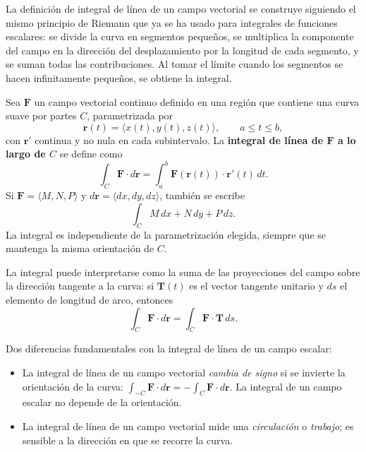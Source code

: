 La definición de integral de línea de un campo vectorial se construye
siguiendo el mismo principio de Riemann que ya se ha usado para
integrales de funciones escalares: se divide la curva en segmentos
pequeños, se multiplica la componente del campo en la dirección del
desplazamiento por la longitud de cada segmento, y se suman todas las
contribuciones. Al tomar el límite cuando los segmentos se hacen
infinitamente pequeños, se obtiene la integral.

\begin{definition}
Sea $\mathbf{F}$ un campo vectorial continuo definido en una región que
contiene una curva suave por partes $C$, parametrizada por
\[
\mathbf{r}(t) = \langle x(t), y(t), z(t) \rangle, \qquad a \le t \le b,
\]
con $\mathbf{r}'$ continua y no nula en cada subintervalo. La
\textbf{integral de línea de $\mathbf{F}$ a lo largo de $C$} se define
como
\[
\int_C \mathbf{F} \cdot d\mathbf{r}
= \int_a^b \mathbf{F}(\mathbf{r}(t)) \cdot \mathbf{r}'(t) \, dt.
\]
Si $\mathbf{F} = \langle M, N, P \rangle$ y $d\mathbf{r} = \langle dx,
dy, dz \rangle$, también se escribe
\[
\int_C M\,dx + N\,dy + P\,dz.
\]
La integral es independiente de la parametrización elegida, siempre que
se mantenga la misma orientación de $C$.
\end{definition}

La integral puede interpretarse como la suma de las proyecciones del
campo sobre la dirección tangente a la curva: si $\mathbf{T}(t)$ es el
vector tangente unitario y $ds$ el elemento de longitud de arco,
entonces
\[
\int_C \mathbf{F} \cdot d\mathbf{r}
= \int_C \mathbf{F} \cdot \mathbf{T} \, ds.
\]

\begin{rem}
Dos diferencias fundamentales con la integral de línea de un campo
escalar:
\begin{itemize}
    \item La integral de línea de un campo vectorial \emph{cambia de
    signo} si se invierte la orientación de la curva: $\int_{-C}
    \mathbf{F}\cdot d\mathbf{r} = -\int_C \mathbf{F}\cdot d\mathbf{r}$.
    La integral de un campo escalar no depende de la orientación.
    \item La integral de línea de un campo vectorial mide una
    \emph{circulación} o \emph{trabajo}; es sensible a la dirección en
    que se recorre la curva.
\end{itemize}
\end{rem}

